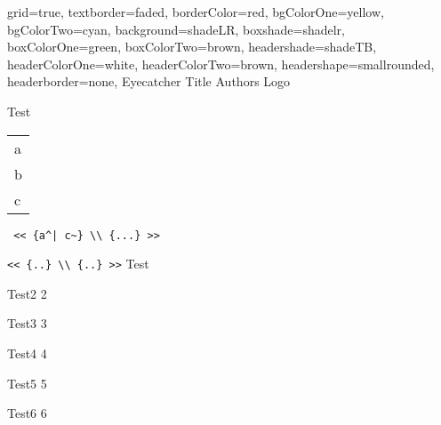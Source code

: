 \documentclass[a4paper,portrait,fontscale=1,margin=1cm,debug,table,showframe]{baposter}
\begin{document}
\begin{poster}{
  grid=true,
  textborder=faded,
  borderColor=red,
  bgColorOne=yellow,
  bgColorTwo=cyan,
  background=shadeLR,
  boxshade=shadelr,
  boxColorOne=green,
  boxColorTwo=brown,
  headershade=shadeTB,
  headerColorOne=white,
  headerColorTwo=brown,
  headershape=smallrounded,
  headerborder=none,
}
  {Eyecatcher}   %
  {\Huge Title}  %
  {Authors}  %
  {Logo}  %


\begin{posterbox}[span=2]{Test}

\begin{tabular}{l}
 a\\
 b\\
 c\\
\end{tabular}

\begin{verbatim}
 << {a^| c~} \\ {...} >>
\end{verbatim}
\verb+<< {..} \\ {..} >>+
Test

\end{posterbox}

\begin{posterbox}[name=a2,column=2]{Test2}
2
\end{posterbox}
\makeatletter
{}

\begin{posterbox}[name=a3,column=2, below=auto]{Test3}
3
\end{posterbox}

\begin{posterbox}[name=a4,column=2, below=auto]{Test4}
4
\end{posterbox}

\begin{posterbox}[name=a5,column=2, below=a4]{Test5}
5
\end{posterbox}

\begin{posterbox}[name=a6,column=2, below=a5]{Test6}
6
\end{posterbox}


\end{poster}
\end{document}
